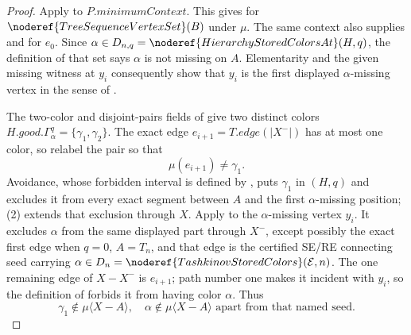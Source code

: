 \begin{proof}
Apply  to
\(P.\mathit{minimumContext}\).  This gives
 for
\(\noderef{TreeSequenceVertexSet}(B)\) under \(\mu\).  The same context
also supplies  and
 for \(e_0\).  Since
\(\alpha\in D_{n,q}=\noderef{HierarchyStoredColorsAt}(H,q)\),
the definition of that set says \(\alpha\) is not missing on \(A\).
Elementarity and the given missing witness at \(y_i\) consequently show
that \(y_i\) is the first displayed \(\alpha\)-missing vertex in the
sense of .

The two-color and disjoint-pairs fields of  give
two distinct colors
\(H.\mathit{good}.\Gamma^q_\alpha=\{\gamma_1,\gamma_2\}\).
The exact edge \(e_{i+1}=T.\mathit{edge}(|X^-|)\) has at most one color,
so relabel the pair so that
\[
                         \mu(e_{i+1})\ne\gamma_1.             \tag{2}
\]
Avoidance, whose forbidden interval is defined by
, puts \(\gamma_1\) in
\((H,q)\) and excludes it from every
exact segment between \(A\) and the first \(\alpha\)-missing position;
(2) extends that exclusion through \(X\).  Apply
 to the \(\alpha\)-missing
vertex \(y_i\).  It excludes \(\alpha\) from the same displayed part
through \(X^-\), except possibly the exact first edge when \(q=0\),
\(A=T_n\), and that edge is the certified SE/RE connecting seed carrying
\(\alpha\in D_n=\noderef{TashkinovStoredColors}(\mathcal E,n)\).
The one remaining edge of \(X-X^-\) is \(e_{i+1}\); path number one makes
it incident with \(y_i\), so the definition of
 forbids it from having color \(\alpha\).  Thus
\[
 \gamma_1\notin\mu\langle X-A\rangle,
 \quad
 \alpha\notin\mu\langle X-A\rangle
 \text{ apart from that named seed}.                         \tag{3}
\]


\end{proof}
